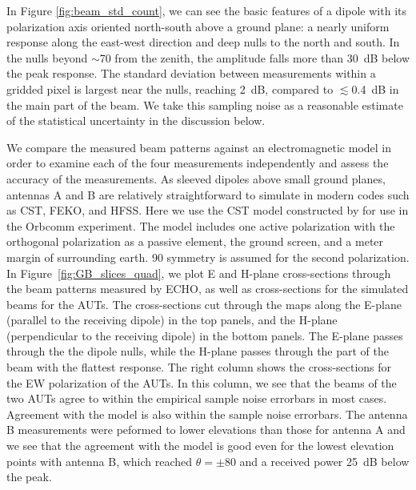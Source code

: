 \documentclass[preprint2,numberedappendix,tighten,twocolappendix]{aastex6}
\begin{document}
In Figure \ref{fig:beam_std_count}, we can see the basic features of a dipole with its polarization axis oriented north-south above a ground plane: a nearly uniform response along the east-west direction and deep nulls to the north and south.  In the nulls beyond $\sim$70\arcdeg{} from the zenith, the amplitude falls more than 30~dB below the peak response.  The standard deviation between measurements within a gridded pixel is largest near the nulls, reaching 2~dB, compared to $\lesssim$0.4~dB in the main part of the beam.  We take this sampling noise as a reasonable estimate of the statistical uncertainty in the discussion below.  

We compare the measured beam patterns against an electromagnetic model in order to examine each of the four measurements independently and assess the accuracy of the measurements.  As sleeved dipoles above small ground planes, antennas A and B are relatively straightforward to simulate in modern codes such as CST, FEKO, and HFSS. Here we use the CST model constructed by \citet{2015RaSc...50..614N} for use in the Orbcomm experiment.  The model includes one active polarization with the orthogonal polarization as a passive element, the ground screen, and a meter margin of surrounding earth. 90\arcdeg{} symmetry is assumed for the second polarization.   In Figure~\ref{fig:GB_slices_quad}, we plot E and H-plane cross-sections through the beam patterns measured by ECHO, as well as cross-sections for the simulated beams for the AUTs.   The cross-sections cut through the maps along the E-plane (parallel to the receiving dipole) in the top panels, and the H-plane (perpendicular to the receiving dipole) in the bottom panels.  The E-plane passes through the the dipole nulls, while the H-plane passes through the part of the beam with the flattest response.   The right column shows the cross-sections for the EW polarization of the AUTs.  In this column, we see that the beams of the two AUTs agree to within the empirical sample noise errorbars in most cases.  Agreement with the model is also within the sample noise errorbars.  The antenna B measurements were peformed to lower elevations than those for antenna A and we see that the agreement with the model is good even for the lowest elevation points with antenna B, which reached $\theta=\pm80$\arcdeg{} and a received power 25~dB below the peak.    
\end{document}
